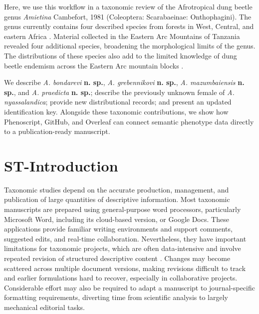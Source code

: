 Here, we use this workflow in a taxonomic review of the Afrotropical dung beetle genus \textit{Amietina} Cambefort, 1981 (Coleoptera: Scarabaeinae: Onthophagini). The genus currently contains four described species from forests in West, Central, and eastern Africa \citep{cambefort1981amietina, branco1989deux}. Material collected in the Eastern Arc Mountains of Tanzania revealed four additional species, broadening the morphological limits of the genus. The distributions of these species also add to the limited knowledge of dung beetle endemism across the Eastern Arc mountain blocks \citep{burgess2007biological, montanaro2024microallopatric}.

We describe \textit{A. bondarevi} \textbf{n. sp.}, \textit{A. grebennikovi} \textbf{n. sp.}, \textit{A. mazumbaiensis} \textbf{n. sp.}, and \textit{A. praedicta} \textbf{n. sp.}; describe the previously unknown female of \textit{A. nyassalandica}; provide new distributional records; and present an updated identification key. Alongside these taxonomic contributions, we show how Phenoscript, GitHub, and Overleaf can connect semantic phenotype data directly to a publication-ready manuscript.



\section*{ST-Introduction}


Taxonomic studies depend on the accurate production, management, and publication of large quantities of descriptive information. Most taxonomic manuscripts are prepared using general-purpose word processors, particularly Microsoft Word, including its cloud-based version, or Google Docs. These applications provide familiar writing environments and support comments, suggested edits, and real-time collaboration. Nevertheless, they have important limitations for taxonomic projects, which are often data-intensive and involve repeated revision of structured descriptive content \citep{smith2013beyond, penev2017strategies}. Changes may become scattered across multiple document versions, making revisions difficult to track and earlier formulations hard to recover, especially in collaborative projects. Considerable effort may also be required to adapt a manuscript to journal-specific formatting requirements, diverting time from scientific analysis  to largely mechanical editorial tasks.

